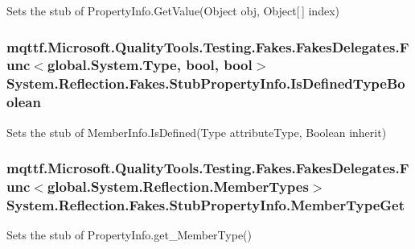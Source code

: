 Sets the stub of Property\-Info.\-Get\-Value(\-Object obj, Object\mbox{[}$\,$\mbox{]} index)

\hypertarget{class_system_1_1_reflection_1_1_fakes_1_1_stub_property_info_aad6cd150ade57fee3bd628a0b173ee36}{
\subsubsection[{Is\-Defined\-Type\-Boolean}]{\setlength{\rightskip}{0pt plus 5cm}mqttf.\-Microsoft.\-Quality\-Tools.\-Testing.\-Fakes.\-Fakes\-Delegates.\-Func$<$global.\-System.\-Type, bool, bool$>$ System.\-Reflection.\-Fakes.\-Stub\-Property\-Info.\-Is\-Defined\-Type\-Boolean}}\label{class_system_1_1_reflection_1_1_fakes_1_1_stub_property_info_aad6cd150ade57fee3bd628a0b173ee36}


Sets the stub of Member\-Info.\-Is\-Defined(\-Type attribute\-Type, Boolean inherit)

\hypertarget{class_system_1_1_reflection_1_1_fakes_1_1_stub_property_info_a318c153d510531c40d5c1610ee3a851d}{
\subsubsection[{Member\-Type\-Get}]{\setlength{\rightskip}{0pt plus 5cm}mqttf.\-Microsoft.\-Quality\-Tools.\-Testing.\-Fakes.\-Fakes\-Delegates.\-Func$<$global.\-System.\-Reflection.\-Member\-Types$>$ System.\-Reflection.\-Fakes.\-Stub\-Property\-Info.\-Member\-Type\-Get}}\label{class_system_1_1_reflection_1_1_fakes_1_1_stub_property_info_a318c153d510531c40d5c1610ee3a851d}


Sets the stub of Property\-Info.\-get\-\_\-\-Member\-Type()

